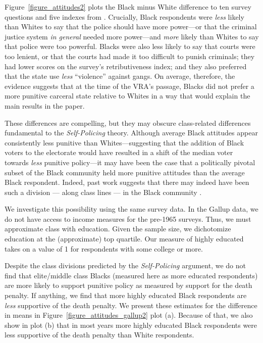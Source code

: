 \documentclass[12pt]{article}
\begin{document}
Figure~\ref{figure_attitudes2} plots the Black minus White difference to ten survey questions and five indexes from \cite{Violence1969}.  Crucially, Black respondents were \emph{less} likely than Whites to say that the police should have more power---or that the criminal justice system \emph{in general} needed more power---and \emph{more} likely than Whites to say that police were too powerful.  Blacks were also less likely to say that courts were too lenient, or that the courts had made it too difficult to punish criminals; they had lower scores on the survey's retributiveness index; and they also preferred that the state use \emph{less} ``violence'' against gangs.  On average, therefore, the evidence suggests that at the time of the VRA's passage, Blacks did not prefer a more punitive carceral state relative to Whites in a way that would explain the main results in the paper.

These differences are compelling, but they may obscure class-related differences fundamental to the \emph{Self-Policing} theory.  Although average Black attitudes appear consistently less punitive than Whites---suggesting that the addition of Black voters to the electorate would have resulted in a shift of the median voter towards \emph{less} punitive policy---it may have been the case that a politically pivotal subset of the Black community held more punitive attitudes than the average Black respondent.  Indeed, past work suggests that there may indeed have been such a division --- along class lines --- in the Black community \citep{Fortner:2015uz,FormanJr:2017tz,Clegg:2018uq}.

We investigate this possibility using the same survey data.  In the Gallup data, we do not have access to income measures for the pre-1965 surveys.  Thus, we must approximate class with education.  Given the sample size, we dichotomize education at the (approximate) top quartile.  Our measure of highly educated takes on a value of 1 for respondents with some college or more.

Despite the class divisions predicted by the \emph{Self-Policing} argument, we do not find that elite/middle class Blacks (measured here as more educated respondents) are more likely to support punitive policy as measured by support for the death penalty.  If anything, we find that more highly educated Black respondents are \emph{less} supportive of the death penalty.  We present these estimates for the difference in means in Figure~\ref{figure_attitudes_gallup2} plot (a).  Because of that, we also show in plot (b) that in most years more highly educated Black respondents were less supportive of the death penalty than White respondents.
\end{document}
